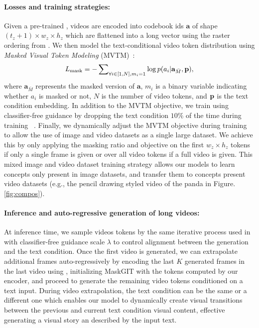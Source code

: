 \paragraph{Losses and training strategies:}
Given a pre-trained \cvivit, videos are encoded into codebook ids $\textbf{a}$ of shape $(t_z + 1)\times w_z \times h_z$ which are flattened into a long vector using the raster ordering from \cite{vit_vqgan}. We then model the text-conditional video token distribution using \textit{Masked Visual Token Modeling} (MVTM)~\cite{MASKGIT}:
\begin{equation}
    L_{\text{mask}}= - \sum\nolimits_{\forall i\in[1,N],m_i=1} \log p(a_i | \textbf{a}_{\bar{M}}, \mathbf{p}),
\end{equation}
where $\textbf{a}_{\bar{M}}$ represents the masked version of $\textbf{a}$, $m_i$ is a binary variable indicating whether $a_i$ is masked or not, $N$ is the number of video tokens, and $\mathbf{p}$ is the text condition embedding.
In addition to the MVTM objective, we train using classifier-free guidance by dropping the text condition $10\%$ of the time during training~\cite{cfg,PARTI} .
Finally, we dynamically adjust the MVTM objective during training to allow the use of image and video datasets as a single large dataset.
We achieve this by only applying the masking ratio and objective on the first $w_z \times h_z$ tokens if only a single frame is given or over all video tokens if a full video is given. 
This mixed image and video dataset training strategy allows our models to learn concepts only present in image datasets, and transfer them to concepts present video datasets (e.g., the pencil drawing styled video of the panda in Figure.\ref{fig:compos}).

\paragraph{Inference and auto-regressive generation of long videos:}
At inference time, we sample videos tokens by the same iterative process used in \cite{MASKGIT} with classifier-free guidance scale $\lambda$ to control alignment between the generation and the text condition. Once the first video is generated, we can extrapolate additional frames auto-regressively by encoding the last $K$ generated frames in the last video using \cvivit, initializing MaskGIT with the tokens computed by our \cvivit encoder, and proceed to generate the remaining video tokens conditioned on a text input. During video extrapolation, the text condition can be the same or a different one which enables our model to dynamically create visual transitions between the previous and current text condition visual content, effective generating a visual story an described by the input text.

